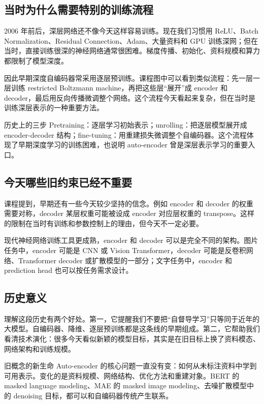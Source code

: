 \documentclass[a4paper]{article}
\begin{document}
\subsection{当时为什么需要特别的训练流程}

2006 年前后，深层网络还不像今天这样容易训练。现在我们习惯用 ReLU、Batch Normalization、Residual Connection、Adam、大量资料和 GPU 训练深网；但在当时，直接训练很深的神经网络通常很困难。梯度传播、初始化、资料规模和算力都限制了模型深度。

因此早期深度自编码器常采用逐层预训练。课程图中可以看到类似流程：先一层一层训练 restricted Boltzmann machine，再把这些层“展开”成 encoder 和 decoder，最后用反向传播微调整个网络。这个流程今天看起来复杂，但在当时是训练深层表示的一种重要方法。

\begin{knowledgebox}{历史上的三步}
    Pretraining：逐层学习初始表示；unrolling：把逐层模型展开成 encoder-decoder 结构；fine-tuning：用重建损失微调整个自编码器。这个流程体现了早期深度学习的训练困难，也说明 auto-encoder 曾是深层表示学习的重要入口。
\end{knowledgebox}

\subsection{今天哪些旧约束已经不重要}

课程提到，早期还有一些今天较少坚持的信念。例如 encoder 和 decoder 的权重需要对称，decoder 某层权重可能被设成 encoder 对应层权重的 transpose。这样的限制在当时有训练和参数控制上的理由，但今天不一定必要。

现代神经网络训练工具更成熟，encoder 和 decoder 可以是完全不同的架构。图片任务中，encoder 可能是 CNN 或 Vision Transformer，decoder 可能是反卷积网络、Transformer decoder 或扩散模型的一部分；文字任务中，encoder 和 prediction head 也可以按任务需求设计。

\subsection{历史意义}

理解这段历史有两个好处。第一，它提醒我们不要把“自督导学习”只等同于近年的大模型。自编码器、降维、逐层预训练都是这条线的早期组成。第二，它帮助我们看清技术演化：很多今天看似新颖的模型目标，其实是在旧目标上换了资料模态、网络架构和训练规模。

\begin{importantbox}{旧概念的新生命}
    Auto-encoder 的核心问题一直没有变：如何从未标注资料中学到可用表示。变化的是资料规模、网络结构、优化方法和重建对象。BERT 的 masked language modeling、MAE 的 masked image modeling、去噪扩散模型中的 denoising 目标，都可以和自编码器传统产生联系。
\end{importantbox}
\end{document}
